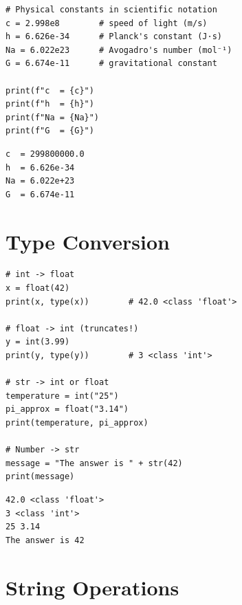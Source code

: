 \begin{codeblock}[title=\textbf{Python --- Scientific notation}]
\begin{verbatim}
# Physical constants in scientific notation
c = 2.998e8        # speed of light (m/s)
h = 6.626e-34      # Planck's constant (J·s)
Na = 6.022e23      # Avogadro's number (mol⁻¹)
G = 6.674e-11      # gravitational constant

print(f"c  = {c}")
print(f"h  = {h}")
print(f"Na = {Na}")
print(f"G  = {G}")
\end{verbatim}
\end{codeblock}

\begin{codeoutput}
\begin{verbatim}
c  = 299800000.0
h  = 6.626e-34
Na = 6.022e+23
G  = 6.674e-11
\end{verbatim}
\end{codeoutput}

\section{Type Conversion}

\begin{codeblock}[title=\textbf{Python --- Conversions}]
\begin{verbatim}
# int -> float
x = float(42)
print(x, type(x))        # 42.0 <class 'float'>

# float -> int (truncates!)
y = int(3.99)
print(y, type(y))        # 3 <class 'int'>

# str -> int or float
temperature = int("25")
pi_approx = float("3.14")
print(temperature, pi_approx)

# Number -> str
message = "The answer is " + str(42)
print(message)
\end{verbatim}
\end{codeblock}

\begin{codeoutput}
\begin{verbatim}
42.0 <class 'float'>
3 <class 'int'>
25 3.14
The answer is 42
\end{verbatim}
\end{codeoutput}

\section{String Operations}

